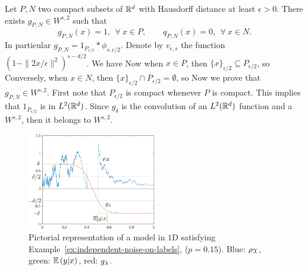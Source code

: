 \bp\label{prop:exists-gPN}
Let $P, N$ two compact subsets of $\mathbb R^d$ with Hausdorff distance at least $\epsilon > 0$. There exists $g_{P, N} \in W^{s,2}$ such that 
$$ g_{P,N}(x) = 1,~~ \forall ~ x \in P,\qquad q_{P,N}(x) = 0,~~ \forall ~ x \in N.$$
In particular $g_{P, N} = 1_{P_{\epsilon/2}} * \phi_{s,\epsilon/2}$.
\ep
\bpr
Denote by $v_{\epsilon,s}$ the function $(1 - \|2x/\epsilon\|^2)^{s - d/2}$. We have
Now when $x \in P$, then $\{x\}_{\epsilon/2} \subseteq P_{\epsilon/2}$, so 
Conversely, when $x \in N$, then $\{x\}_{\epsilon/2} \cap P_{\epsilon/2} = \emptyset$, so
Now we prove that $g_{P,N} \in W^{s,2}$. First note that $P_{\epsilon/2}$ is compact whenever $P$ is compact. This implies that $1_{P_{\epsilon/2}}$ is in $L^2(\mathbb R^d)$.
Since $g_\delta$ is the convolution of an $L^2(\mathbb R^d)$ function and a $W^{s,2}$, then it belongs to $W^{s,2}$.
\epr 

\begin{figure}[t]
  \centering
  \includegraphics[width=0.5\textwidth]{figures/example.pdf}
  \caption{Pictorial representation of a model in $1$D satisfying Example~\ref{ex:independent-noise-on-labels}, ($p = 0.15$). Blue: ${\rho_{{\mathcal X}}}$, green: $\mathbb{E}\left({y}\middle|{x}\right)$, red: $g_\lambda$.}
  \label{fig:example-A5}
\end{figure}


